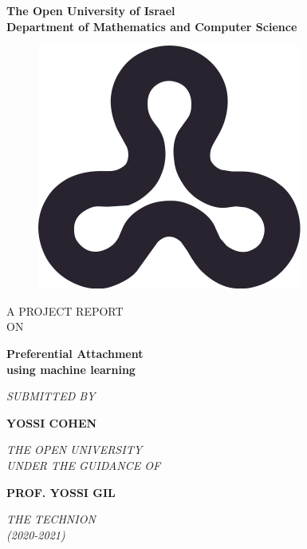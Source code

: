 \documentclass[a4paper, 12pt]{report}
\begin{document}
\newenvironment{frontmatter}{}{}
\begin{frontmatter}
\begin{titlepage}
\begin{center}
\textup{\large \textbf{The Open University of Israel}}\\[0.5cm]
\textbf{\large Department of Mathematics and Computer Science}


\begin{center}
\begin{figure}[h]  %
\centering
\includegraphics[width=0.3\linewidth]{./logo}
\end{figure}
\end{center}


\textup{\large A PROJECT REPORT\\[0.4cm]ON}\\[0.4cm]
\begin{LARGE}
{\textbf {Preferential Attachment }}\\
{\textbf {using machine learning }}\\[1cm]
\end{LARGE}
\textit{SUBMITTED BY}\\[0.3cm]
\begin{large}
\textbf{YOSSI COHEN}\\[0.3cm]
\end{large}
\textit{THE OPEN UNIVERSITY}\\[1cm]
\textit{UNDER THE GUIDANCE OF}\\[0.3cm]
\begin{large}\textbf{PROF. YOSSI GIL}\\[0.3cm]\end{large}
\textit{THE TECHNION}\\[1cm]
\textit{(2020-2021)}
\vfill
\end{center}
\end{titlepage}


\end{frontmatter}
\end{document}
